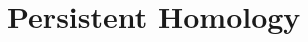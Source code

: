 \documentclass[11pt,a4paper]{report}
\begin{document}


             \chapter{Persistent Homology}
\end{document}
